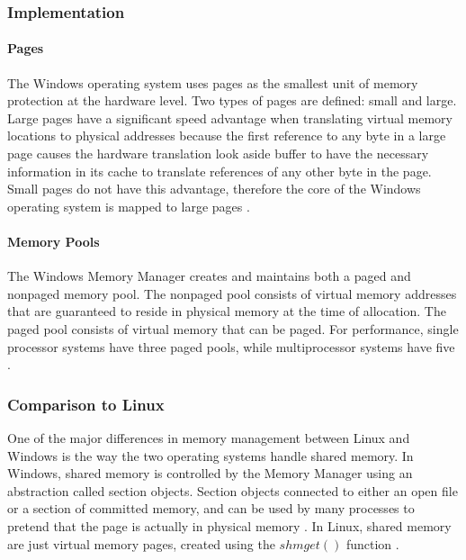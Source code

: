 \documentclass[letterpaper,draftclsnofoot,10pt,onecolumn,titlepage]{IEEEtran}\usepackage[margin=0.75in]{geometry}
\begin{document}
        \subsubsection{Implementation}
            \paragraph{Pages}
            The Windows operating system uses pages as the smallest unit of memory protection at the hardware level.
            Two types of pages are defined: small and large. Large pages have a significant speed advantage when 
            translating virtual memory locations to physical addresses because the first reference to any byte in a 
            large page causes the hardware translation look aside buffer to have the necessary information in its 
            cache to translate references of any other byte in the page. Small pages do not have this advantage,
            therefore the core of the Windows operating system is mapped to large pages \cite{windows}.

            \paragraph{Memory Pools}
            The Windows Memory Manager creates and maintains both a paged and nonpaged memory pool. The nonpaged 
            pool consists of virtual memory addresses that are guaranteed to reside in physical memory at the 
            time of allocation. The paged pool consists of virtual memory that can be paged. For performance,
            single processor systems have three paged pools, while multiprocessor systems have five \cite{windows}.

        \subsubsection{Comparison to Linux}
        One of the major differences in memory management between Linux and Windows is the way the two 
        operating systems handle shared memory. In Windows, shared memory is controlled by the Memory Manager
        using an abstraction called section objects. Section objects connected to either an open file or a 
        section of committed memory, and can be used by many processes to pretend that the page is actually
        in physical memory \cite{windows}. In Linux, shared memory are just virtual memory pages, created 
        using the $shmget()$ function \cite{linux}.
\end{document}
